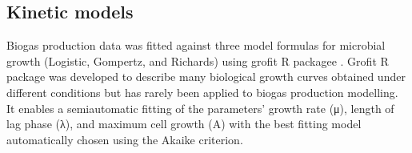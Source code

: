 \subsection{Kinetic models}
Biogas production data was fitted against three model formulas for microbial growth (Logistic, Gompertz, and Richards) using grofit R packagee \cite{Kahm_2010}. Grofit R package was developed to describe many biological growth curves obtained under different conditions but has rarely been applied to biogas production modelling. It enables a semiautomatic fitting of the parameters’ growth rate (μ), length of lag phase (λ), and maximum cell growth (A) with the best fitting model automatically chosen using the Akaike criterion.